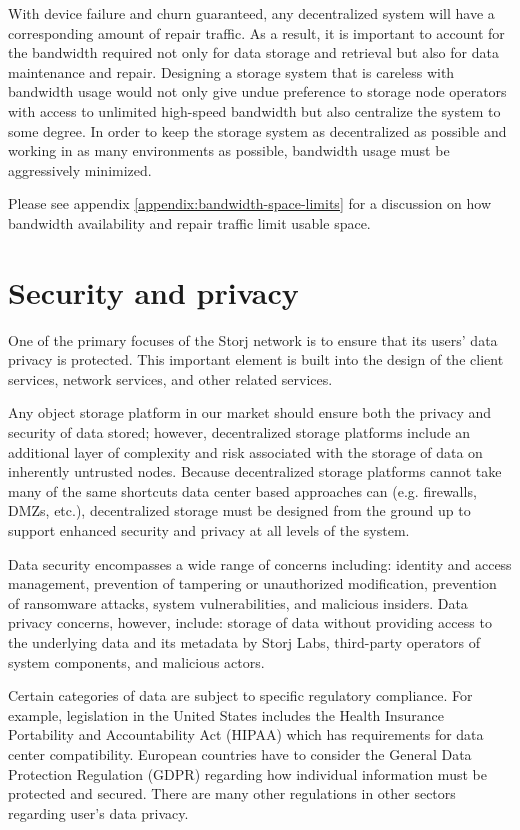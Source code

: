 \documentclass[11pt,fleqn,openany]{book}
\begin{document}
With device failure and churn guaranteed, any decentralized system will have a
corresponding amount of repair traffic. As a result, it is important to account
for the bandwidth required not only for data storage and retrieval but also
for data maintenance and repair. Designing a
storage system that is careless with bandwidth usage would not only give undue
preference to storage node operators with access to unlimited high-speed
bandwidth but also centralize the system to some degree. In order to keep the storage
system as decentralized as possible and working in as many environments
as possible, bandwidth usage must be aggressively minimized.

Please see appendix \ref{appendix:bandwidth-space-limits} for a discussion on how
bandwidth availability and repair traffic limit usable space.

\section{Security and privacy}

One of the primary focuses of the Storj network is to ensure that its users'
data privacy is protected. This important element is
built into the design of the client services, network services, and other related services.

Any object storage platform in our market should ensure both the privacy and
security of data stored; however,
decentralized storage platforms include an additional layer of
complexity and risk associated with the storage of data on inherently
untrusted nodes. Because decentralized storage platforms cannot take many
of the same shortcuts data center based approaches can (e.g. firewalls, DMZs,
etc.), decentralized storage must be designed from the ground up to support
enhanced security and privacy at all levels of the system.

Data security encompasses a wide range of concerns including:
identity and access management, prevention of tampering or unauthorized
modification, prevention of ransomware attacks, system vulnerabilities, and
malicious insiders. Data privacy concerns, however, include: storage of data
without providing access to the underlying data and its metadata by
Storj Labs, third-party operators of system components, and malicious actors.

Certain categories of data are subject to specific regulatory compliance.
For example, legislation in the United States includes
the Health Insurance Portability and
Accountability Act (HIPAA) which has requirements for data center
compatibility. European countries have to consider the General Data Protection
Regulation (GDPR) regarding
how individual information must be protected and secured. There
are many other regulations in other sectors regarding user's data privacy.
\end{document}
